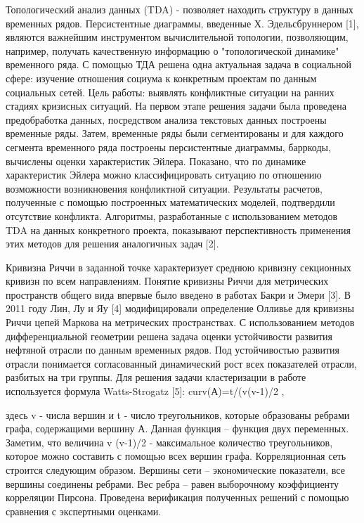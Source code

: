 Топологический анализ данных (TDA) - позволяет находить структуру в данных временных рядов. Персистентные диаграммы, введенные Х. Эдельсбруннером [1], являются важнейшим инструментом вычислительной топологии, позволяющим, например, получать качественную информацию о "топологической динамике" временного ряда.   С помощью ТДА решена одна актуальная задача в социальной сфере: изучение отношения социума к конкретным проектам по данным социальных сетей. Цель работы: выявлять конфликтные ситуации на ранних стадиях кризисных ситуаций.  На первом этапе решения задачи была проведена предобработка данных, посредством анализа текстовых данных построены временные ряды. Затем, временные ряды были сегментированы и для каждого сегмента временного ряда построены персистентные диаграммы,  барркоды, вычислены оценки характеристик Эйлера. Показано, что по динамике характеристик Эйлера можно классифицировать ситуацию по отношению возможности возникновения  конфликтной ситуации. Результаты расчетов, полученные с помощью построенных математических моделей, подтвердили отсутствие конфликта. Алгоритмы, разработанные с использованием методов TDA на данных конкретного проекта, показывают перспективность применения этих методов для решения аналогичных задач [2].

Кривизна Риччи в заданной точке характеризует среднюю кривизну секционных кривизн по всем направлениям. Понятие кривизны Риччи для метрических пространств общего вида впервые было введено в работах Бакри и Эмери [3]. В 2011 году Лин, Лу и Яу [4] модифицировали определение Олливье для кривизны Риччи цепей Маркова на метрических пространствах.
С использованием методов дифференциальной геометрии решена задача оценки устойчивости развития нефтяной отрасли по данным временных рядов. Под устойчивостью развития отрасли понимается согласованный динамический рост всех показателей отрасли, разбитых на три группы. 
Для решения задачи кластеризации в работе используется формула Watts-Strogatz [5]: 
curv(А)=t/(v(v-1)/2 ,

здесь v - числа вершин и t - число треугольников, которые образованы ребрами графа, содержащими вершину А. Данная функция – функция двух переменных. Заметим, что величина v (v-1)/2 - максимальное количество треугольников, которое можно составить с помощью всех вершин графа.
Корреляционная сеть строится следующим образом. Вершины сети – экономические показатели, все вершины соединены ребрами. Вес ребра – равен выборочному коэффициенту корреляции Пирсона. Проведена верификация полученных решений с помощью сравнения с экспертными оценками. 

